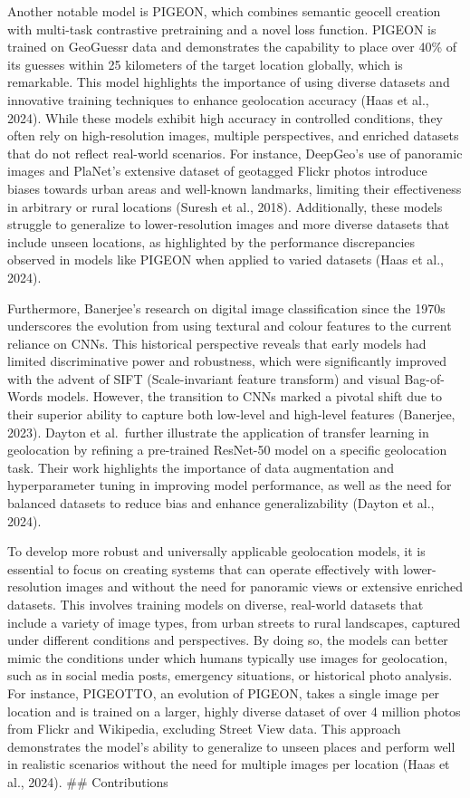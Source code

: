 \documentclass{article}
\begin{document}
Another notable model is PIGEON, which combines semantic geocell
creation with multi-task contrastive pretraining and a novel loss
function. PIGEON is trained on GeoGuessr data and demonstrates the
capability to place over 40\% of its guesses within 25 kilometers of the
target location globally, which is remarkable. This model highlights the
importance of using diverse datasets and innovative training techniques
to enhance geolocation accuracy (Haas et al., 2024). While these models
exhibit high accuracy in controlled conditions, they often rely on
high-resolution images, multiple perspectives, and enriched datasets
that do not reflect real-world scenarios. For instance, DeepGeo's use of
panoramic images and PlaNet's extensive dataset of geotagged Flickr
photos introduce biases towards urban areas and well-known landmarks,
limiting their effectiveness in arbitrary or rural locations (Suresh et
al., 2018). Additionally, these models struggle to generalize to
lower-resolution images and more diverse datasets that include unseen
locations, as highlighted by the performance discrepancies observed in
models like PIGEON when applied to varied datasets (Haas et al., 2024).

Furthermore, Banerjee's research on digital image classification since
the 1970s underscores the evolution from using textural and colour
features to the current reliance on CNNs. This historical perspective
reveals that early models had limited discriminative power and
robustness, which were significantly improved with the advent of SIFT
(Scale-invariant feature transform) and visual Bag-of-Words models.
However, the transition to CNNs marked a pivotal shift due to their
superior ability to capture both low-level and high-level features
(Banerjee, 2023). Dayton et al.~further illustrate the application of
transfer learning in geolocation by refining a pre-trained ResNet-50
model on a specific geolocation task. Their work highlights the
importance of data augmentation and hyperparameter tuning in improving
model performance, as well as the need for balanced datasets to reduce
bias and enhance generalizability (Dayton et al., 2024).

To develop more robust and universally applicable geolocation models, it
is essential to focus on creating systems that can operate effectively
with lower-resolution images and without the need for panoramic views or
extensive enriched datasets. This involves training models on diverse,
real-world datasets that include a variety of image types, from urban
streets to rural landscapes, captured under different conditions and
perspectives. By doing so, the models can better mimic the conditions
under which humans typically use images for geolocation, such as in
social media posts, emergency situations, or historical photo analysis.
For instance, PIGEOTTO, an evolution of PIGEON, takes a single image per
location and is trained on a larger, highly diverse dataset of over 4
million photos from Flickr and Wikipedia, excluding Street View data.
This approach demonstrates the model's ability to generalize to unseen
places and perform well in realistic scenarios without the need for
multiple images per location (Haas et al., 2024). \#\# Contributions
\end{document}
